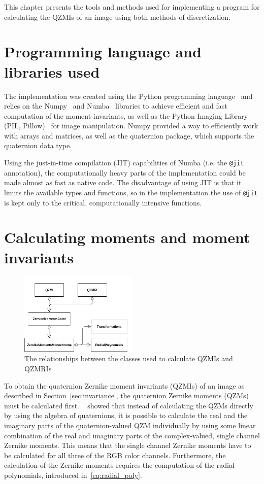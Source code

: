This chapter presents the tools and methods used for implementing a program for calculating the QZMIs of an image using both methods of discretization.

\section{Programming language and libraries used}
The implementation was created using the Python programming language~\cite{python} and relies on the Numpy~\cite{numpy} and Numba~\cite{numba} libraries to achieve efficient and fast computation of the moment invariants, as well as the Python Imaging Library (PIL, Pillow)~\cite{pil} for image manipulation.
Numpy provided a way to efficiently work with arrays and matrices, as well as the quaternion package, which supports the quaternion data type.

Using the just-in-time compilation (JIT) capabilities of Numba (i.e. the \texttt{@jit} annotation), the computationally heavy parts of the implementation could be made almost as fast as native code. The disadvantage of using JIT is that it limits the available types and functions, so in the implementation the use of \texttt{@jit} is kept only to the critical, computationally intensive functions. 

\section{Calculating moments and moment invariants}
\begin{figure}[tbp]
    \centering
        \includegraphics[width=0.5\textwidth]{figures/qzmi_classes.png}
    \caption{The relationships between the classes used to calculate QZMIs and QZMRIs}
    \label{fig:classes}
\end{figure}
To obtain the quaternion Zernike moment invariants (QZMIs) of an image as described in Section~\ref{sec:invariance}, the quaternion Zernike moments (QZMs) must be calculated first. \citeauthor{qzmi}~\cite{qzmi} showed that instead of calculating the QZMs directly by using the algebra of quaternions, it is possible to calculate the real and the imaginary parts of the quaternion-valued QZM individually by using some linear combination of the real and imaginary parts of the complex-valued, single channel Zernike moments. This means that the single channel Zernike moments have to be calculated for all three of the RGB color channels.
Furthermore, the calculation of the Zernike moments requires the computation of the radial polynomials, introduced in~\eqref{eq:radial_poly}.

